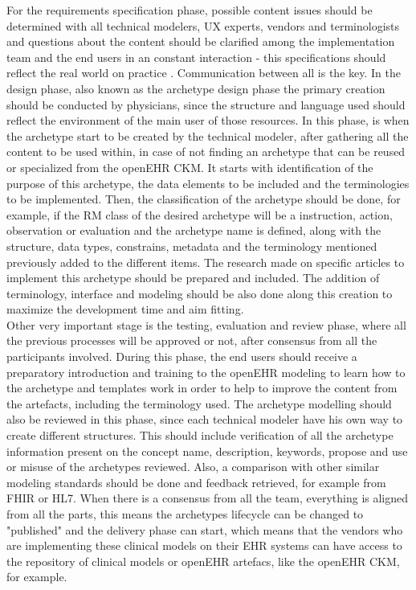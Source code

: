 \documentclass[mim_thesis.tex]{subfiles}
\begin{document}
For the requirements specification phase, possible content issues should be determined with all technical modelers, \ac{UX} experts, vendors and terminologists and questions about the content should be clarified among the implementation team and the end users in an constant interaction - this specifications should reflect the real world on practice \citep{hovenga2013health}. Communication between all is the key. In the design phase, also known as the archetype design phase \citep{Madsen2010} the primary creation should be conducted by physicians, since the structure and language used should reflect the environment of the main user of those resources. In this phase, is when the archetype start to be created by the technical modeler, after gathering all the content to be used within, in case of not finding an archetype that can be reused or specialized from the openEHR CKM. It starts with identification of the purpose of this archetype, the data elements to be included and the terminologies to be implemented. Then, the classification of the archetype should be done, for example, if the RM class of the desired archetype will be a instruction, action, observation or evaluation and the archetype name is defined, along with the structure, data types, constrains, metadata and the terminology mentioned previously added to the different items. The research made on specific articles to implement this archetype should be prepared and included. The addition of terminology, interface and modeling should be also done along this creation to maximize the development time and aim fitting. \\

Other very important stage is the testing, evaluation and review phase, where all the previous processes will be approved or not, after consensus from all the participants involved. During this phase, the end users should receive a preparatory introduction and training to the openEHR modeling to learn how to the archetype and templates work in order to help to improve the content from the artefacts, including the terminology used. The archetype modelling should also be reviewed in this phase, since each technical modeler have his own way to create different structures. This should include verification of all the archetype information present on the concept name, description, keywords, propose and use or misuse of the archetypes reviewed. Also, a comparison with other similar modeling standards should be done and feedback retrieved, for example from FHIR or HL7. When there is a consensus from all the team, everything is aligned from all the parts, this means the archetypes lifecycle can be changed to "published" and the delivery phase can start, which means that the vendors who are implementing these clinical models on their EHR systems can have access to the repository of clinical models or openEHR artefacs, like the openEHR CKM, for example. 
\end{document}
